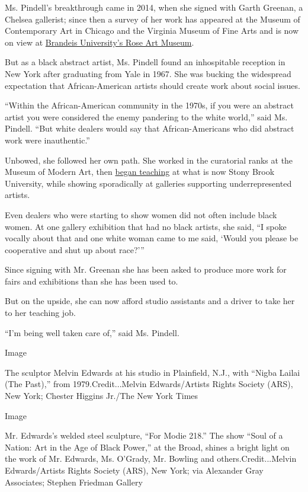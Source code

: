 Ms. Pindell's breakthrough came in 2014, when she signed with Garth
Greenan, a Chelsea gallerist; since then a survey of her work has
appeared at the Museum of Contemporary Art in Chicago and the Virginia
Museum of Fine Arts and is now on view at
\href{https://www.brandeis.edu/rose/}{Brandeis University's Rose Art
Museum}.

But as a black abstract artist, Ms. Pindell found an inhospitable
reception in New York after graduating from Yale in 1967. She was
bucking the widespread expectation that African-American artists should
create work about social issues.

``Within the African-American community in the 1970s, if you were an
abstract artist you were considered the enemy pandering to the white
world,'' said Ms. Pindell. ``But white dealers would say that
African-Americans who did abstract work were inauthentic.''

Unbowed, she followed her own path. She worked in the curatorial ranks
at the Museum of Modern Art, then
\href{http://art.stonybrook.edu/person/howardena-pindell/}{began
teaching} at what is now Stony Brook University, while showing
sporadically at galleries supporting underrepresented artists.

Even dealers who were starting to show women did not often include black
women. At one gallery exhibition that had no black artists, she said,
``I spoke vocally about that and one white woman came to me said, `Would
you please be cooperative and shut up about race?'''

Since signing with Mr. Greenan she has been asked to produce more work
for fairs and exhibitions than she has been used to.

But on the upside, she can now afford studio assistants and a driver to
take her to her teaching job.

``I'm being well taken care of,'' said Ms. Pindell.

Image

The sculptor Melvin Edwards at his studio in Plainfield, N.J., with
``Nigba Lailai (The Past),'' from 1979.Credit...Melvin Edwards/Artists
Rights Society (ARS), New York; Chester Higgins Jr./The New York Times

Image

Mr. Edwards's welded steel sculpture, ``For Modie 218.'' The show ``Soul
of a Nation: Art in the Age of Black Power,'' at the Broad, shines a
bright light on the work of Mr. Edwards, Ms. O'Grady, Mr. Bowling and
others.Credit...Melvin Edwards/Artists Rights Society (ARS), New York;
via Alexander Gray Associates; Stephen Friedman Gallery


